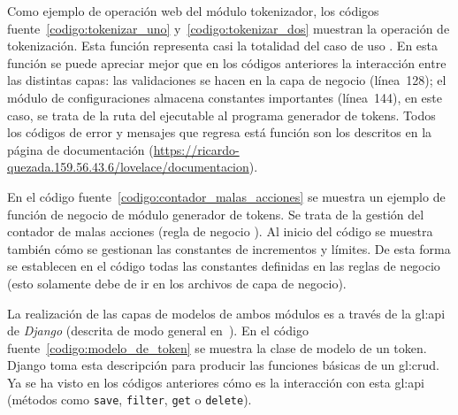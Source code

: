 Como ejemplo de operación web del módulo tokenizador, los códigos
fuente~\ref{codigo:tokenizar_uno} y~\ref{codigo:tokenizar_dos} muestran la
operación de tokenización. Esta función representa casi la totalidad del caso
de uso . En esta función se puede apreciar
mejor que en los códigos anteriores la interacción entre las distintas capas:
las validaciones se hacen en la capa de negocio (línea~128); el módulo de
configuraciones almacena constantes importantes (línea~144), en este caso, se
trata de la ruta del ejecutable al programa generador de tokens. Todos los
códigos de error y mensajes que regresa está función son los descritos en la
página de documentación
(\url{https://ricardo-quezada.159.56.43.6/lovelace/documentacion}).



En el código fuente~\ref{codigo:contador_malas_acciones} se muestra un ejemplo
de función de negocio de módulo generador de tokens. Se trata de la gestión del
contador de malas acciones (regla de negocio ).
Al inicio del código se muestra también cómo se gestionan las constantes de
incrementos y límites. De esta forma se establecen en el código todas las
constantes definidas en las reglas de negocio (esto solamente debe de ir en los
archivos de capa de negocio).


La realización de las capas de modelos de ambos módulos es a través de la
\gls{gl:api} de \textit{Django} (descrita de modo general
en~\cite{django_modelos}). En el código fuente~\ref{codigo:modelo_de_token} se
muestra la clase de modelo de un token. Django toma esta descripción para
producir las funciones básicas de un \gls{gl:crud}. Ya se ha visto en los
códigos anteriores cómo es la interacción con esta \gls{gl:api} (métodos como
\texttt{save}, \texttt{filter}, \texttt{get} o \texttt{delete}).


